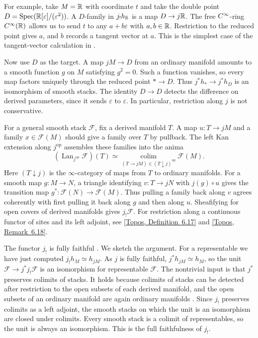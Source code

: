 For example, take $M=\mathbb{R}$ with coordinate $t$ and take the double point
$D=\operatorname{Spec}(\mathbb{R}[\varepsilon]/(\varepsilon^2))$. A $D$-family in
$j_!h_{\mathbb{R}}$ is a map $D\to j\mathbb{R}$. The free $C^\infty$-ring $C^\infty(\mathbb{R})$
allows us to send $t$ to any $a+b\varepsilon$ with $a,b\in\mathbb{R}$.
Restriction to the reduced point gives $a$, and $b$ records a tangent
vector at $a$. This is the simplest case of the tangent-vector
calculation in .

Now use $D$ as the target. A map $jM\to D$ from an ordinary manifold
amounts to a smooth function $g$ on $M$ satisfying $g^2=0$. Such a
function vanishes, so every map factors uniquely through the reduced
point $*\to D$. Thus $j^*h_*\to j^*h_D$ is an isomorphism of smooth
stacks. The identity $D\to D$ detects the difference on derived
parameters, since it sends $\varepsilon$ to $\varepsilon$. In particular,
restriction along $j$ is not conservative.

For a general smooth stack $\mathcal F$, fix a derived manifold $T$. A map $u\colon T\to jM$ and a
family $x\in\mathcal F(M)$ should give a family over $T$ by pullback.
The left Kan extension along $j^{\mathrm{op}}$ assembles these families
into the anima
\[
 (\operatorname{Lan}_{j^{\mathrm{op}}}\mathcal F)(T)
 \simeq \operatorname*{colim}_{(T\to jM)\in(T\downarrow j)^{\mathrm{op}}}
 \mathcal F(M).
\]
Here $(T\downarrow j)$ is the $\infty$-category of maps from $T$ to
ordinary manifolds. For a smooth map $g\colon M\to N$, a triangle
identifying $v\colon T\to jN$ with $j(g)\circ u$ gives the transition
map $g^*\colon\mathcal F(N)\to\mathcal F(M)$. Thus pulling a family
back along $v$ agrees coherently with first pulling it back along $g$
and then along $u$. Sheafifying for open covers of derived manifolds
gives $j_!\mathcal F$. For restriction along a continuous functor of
sites and its left adjoint, see
\href{https://animarium.org/tag/028T/}{[Topos, Definition~6.17]} and
\href{https://animarium.org/tag/028V/}{[Topos, Remark~6.18]}.

The functor $j_!$ is fully faithful
\cite[Proposition~2.1.40]{Steffens_Representability_Elliptic_Moduli}.
We sketch the argument. For a representable we have just computed
$j_!h_M\simeq h_{jM}$. As $j$ is fully faithful,
$j^*h_{jM}\simeq h_M$, so the unit $\mathcal F\to j^*j_!\mathcal F$ is
an isomorphism for representable $\mathcal F$. The nontrivial input is that $j^*$ preserves
colimits of stacks.
It holds because colimits of stacks can be detected after restriction
to the open subsets of each derived manifold, and the open subsets of an
ordinary manifold are again ordinary manifolds
\cite[Lemma~2.1.38 and Proposition~2.1.40(2)]{Steffens_Representability_Elliptic_Moduli}.
Since $j_!$ preserves colimits as a left adjoint, the smooth stacks on
which the unit is an isomorphism are closed under colimits. Every smooth
stack is a colimit of representables, so the unit is always an
isomorphism. This is the full faithfulness of $j_!$.

